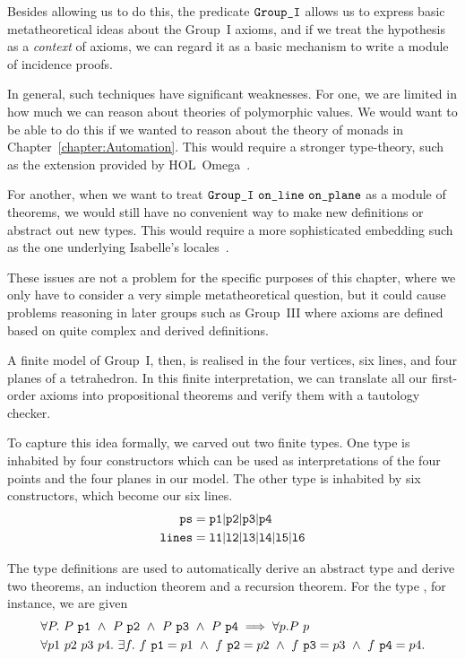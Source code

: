 Besides allowing us to do this, the predicate $\texttt{Group\_I}$ allows us to express basic metatheoretical ideas about the Group~I axioms, and if we treat the hypothesis as a \emph{context} of axioms, we can regard it as a basic mechanism to write a module of incidence proofs. 

In general, such techniques have significant weaknesses. For one, we are limited in how much we can reason about theories of polymorphic values. We would want to be able to do this if we wanted to reason about the theory of monads in Chapter~\ref{chapter:Automation}. This would require a stronger type-theory, such as the extension provided by HOL~Omega~\cite{HOLOmega}.

For another, when we want to treat $\code{Group\_I}\ \code{on\_line}\ \code{on\_plane}$ as a module of theorems, we would still have no convenient way to make new definitions or abstract out new types. This would require a more sophisticated embedding such as the one underlying Isabelle's locales~\cite{IsabelleLocales}.

These issues are not a problem for the specific purposes of this chapter, where we only have to consider a very simple metatheoretical question, but it could cause problems reasoning in later groups such as Group~III where axioms are defined based on quite complex and derived definitions.

A finite model of Group~I, then, is realised in the four vertices, six lines, and four planes of a tetrahedron. In this finite interpretation, we can translate all our first-order axioms into propositional theorems and verify them with a tautology checker.

To capture this idea formally, we carved out two finite types. One type is inhabited by four constructors which can be used as interpretations of the four points and the four planes in our model. The other type is inhabited by six constructors, which become our six lines.
\begin{align*}
\texttt{ps}   &= \texttt{p1} \vert \texttt{p2} \vert\texttt{p3} \vert\texttt{p4}\\
\texttt{lines}&= \texttt{l1} \vert \texttt{l2} \vert\texttt{l3} \vert\texttt{l4} \vert\texttt{l5} \vert\texttt{l6}\\
\end{align*}

The type definitions are used to automatically derive an abstract type and derive two theorems, an induction theorem and a recursion theorem. For the type , for instance, we are given
\begin{align*}
&\forall P.\ P\ \code{p1}\ \wedge\ P\ \code{p2}\ \wedge\ P\ \code{p3}\ \wedge\ P\ \code{p4}\implies\forall p. P\ p\\
&\forall p1\ p2\ p3\ p4.\ \exists f.\ f\ \code{p1} = p1\ \wedge\ f\ \code{p2} = p2\ \wedge\ f\ \code{p3} = p3\ \wedge\ f\ \code{p4} = p4.
\end{align*}

